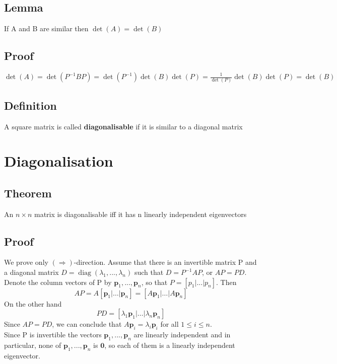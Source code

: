 \documentclass{article}[18pt]
\begin{document}
\subsection{Lemma}
If A and B are similar then $\det(A)=\det(B)$
\subsection{Proof}
$\operatorname{det}(A)=\operatorname{det}\left(P^{-1} B P\right)=\operatorname{det}\left(P^{-1}\right) \operatorname{det}(B) \operatorname{det}(P)=\frac{1}{\operatorname{det}(P)} \operatorname{det}(B) \operatorname{det}(P)=\operatorname{det}(B)$
\subsection{Definition}
A square matrix is called \textbf{diagonalisable} if it is similar to a diagonal matrix
\section{Diagonalisation}
\subsection{Theorem}
An $n\times n$ matrix is diagonalisable iff it has n linearly independent eigenvectors
\subsection{Proof}
We prove only $(\Rightarrow)$-direction. Assume that there is an invertible matrix P and a diagonal matrix $D=\operatorname{diag}(\lambda_1,...,\lambda_n)$ such that $D=P^{-1}AP$, or $AP=PD$.\\
Denote the column vectors of P by $\mathbf{p}_1,...,\mathbf{p}_n$, so that $P=[p_1|...|p_n]$. Then
\[ 
A P=A\left[\mathbf{p}_{1}|\ldots| \mathbf{p}_{n}\right]=\left[A \mathbf{p}_{1}|\ldots| A \mathbf{p}_{n}\right]
\]
On the other hand
\[ 
P D=\left[\lambda_{1} \mathbf{p}_{1}|\ldots| \lambda_{n} \mathbf{p}_{n}\right]
\]
Since $AP=PD$, we can conclude that $A\mathbf{p}_i=\lambda_i\mathbf{p}_i$ for all $1\leqslant i\leqslant n$.\\
Since P is invertible the vectors $\mathbf{p}_1,...,\mathbf{p}_n$ are linearly independent and in particular, none of $\mathbf{p}_1,...,\mathbf{p}_n$ is $\mathbf{0}$, so each of them is a linearly independent eigenvector.
\end{document}
